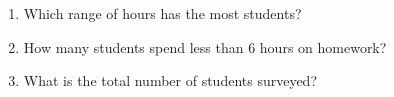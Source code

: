 \begin{enumerate}[label=\color{blue}\arabic*.]
    \begin{enumerate}[label=(\alph*)]
        \item Which range of hours has the most students?
        \item How many students spend less than 6 hours on homework?
        \item What is the total number of students surveyed?
    \end{enumerate}
\end{enumerate}
